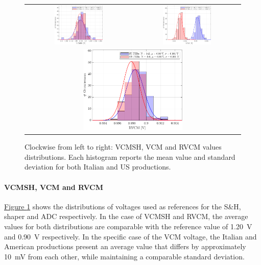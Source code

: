 \begin{figure}[h!]
    \centering
    \begin{tabular}{cc}
        \includegraphics[width=0.475\textwidth]{Images/chap2/results/VCMSH.pdf} & \includegraphics[width=0.475\textwidth]{Images/chap2/results/VCM.pdf}\\
        \multicolumn{2}{c}{\includegraphics[width=0.475\textwidth]{Images/chap2/results/RVCM.pdf}}
    \end{tabular}
    \caption{Clockwise from left to right: VCMSH, VCM and RVCM values distributions. Each histogram reports the mean value and standard deviation for both Italian and US productions.}
    \label{figVCMSHVCMRVCM}
\end{figure}

\paragraph{VCMSH, VCM and RVCM} \hyperref[figVCMSHVCMRVCM]{Figure \ref{figVCMSHVCMRVCM}} shows the distributions of voltages used as references for the S\&H, shaper and ADC respectively. In the case of VCMSH and RVCM, the average values for both distributions are comparable with the reference value of \SI{1.20}{\volt} and \SI{0.90}{\volt} respectively. In the specific case of the VCM voltage, the Italian and American productions present an average value that differs by approximately \SI{10}{\milli\volt} from each other, while maintaining a comparable standard deviation.

